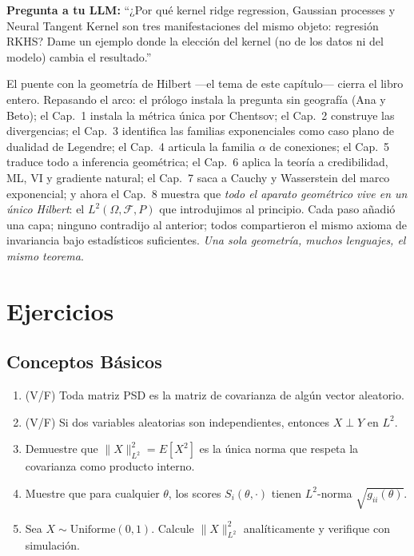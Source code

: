 \bigskip
\noindent
\textbf{Pregunta a tu LLM:} ``¿Por qu\'e kernel ridge regression, Gaussian processes y Neural Tangent Kernel son tres manifestaciones del mismo objeto: regresi\'on RKHS?  Dame un ejemplo donde la elecci\'on del kernel (no de los datos ni del modelo) cambia el resultado.''



\bigskip
\noindent
El puente con la geometría de Hilbert ---el tema de este capítulo--- cierra el libro entero. Repasando el arco: el prólogo instala la pregunta sin geografía (Ana y Beto); el Cap.~1 instala la métrica única por Chentsov; el Cap.~2 construye las divergencias; el Cap.~3 identifica las familias exponenciales como caso plano de dualidad de Legendre; el Cap.~4 articula la familia $\alpha$ de conexiones; el Cap.~5 traduce todo a inferencia geométrica; el Cap.~6 aplica la teoría a credibilidad, ML, VI y gradiente natural; el Cap.~7 saca a Cauchy y Wasserstein del marco exponencial; y ahora el Cap.~8 muestra que \emph{todo el aparato geométrico vive en un único Hilbert}: el $L^2(\Omega, \mathcal{F}, P)$ que introdujimos al principio. Cada paso añadió una capa; ninguno contradijo al anterior; todos compartieron el mismo axioma de invariancia bajo estadísticos suficientes. \emph{Una sola geometría, muchos lenguajes, el mismo teorema}.

\section{Ejercicios}

\subsection*{Conceptos Básicos}
\begin{enumerate}
	\item[$\star$] (V/F) Toda matriz PSD es la matriz de covarianza de algún vector aleatorio.
	\item[$\star$] (V/F) Si dos variables aleatorias son independientes, entonces $X \perp Y$ en $L^2$.
	\item[$\star$] Demuestre que $\|X\|_{L^2}^2 = E[X^2]$ es la única norma que respeta la covarianza como producto interno.
	\item[$\star$] Muestre que para cualquier $\theta$, los scores $S_i(\theta, \cdot)$ tienen $L^2$-norma $\sqrt{g_{ii}(\theta)}$.
	\item[$\star$] Sea $X \sim \text{Uniforme}(0,1)$. Calcule $\|X\|_{L^2}^2$ analíticamente y verifique con simulación.
\end{enumerate}

